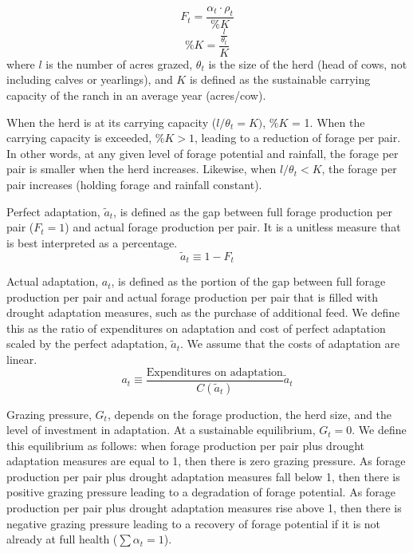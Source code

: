 \documentclass[11pt]{article}
\begin{document}
\begin{equation}
F_t = \frac{\alpha_t \cdot \rho_t}{\%K}
\end{equation}
\begin{equation}
\%K = \frac{\frac{l}{\theta_t}}{K}
\end{equation}
where $l$ is the number of acres grazed, $\theta_t$ is the size of the herd (head of cows, not including calves or yearlings), and $K$ is defined as the sustainable carrying capacity of the ranch in an average year (acres/cow).

When the herd is at its carrying capacity ($l/\theta_t = K)$, $\%K$ = 1. When the carrying capacity is exceeded, $\%K > 1$, leading to a reduction of forage per pair. In other words, at any given level of forage potential and rainfall, the forage per pair is smaller when the herd increases. Likewise, when $l / \theta_t < K$, the forage per pair increases (holding forage and rainfall constant). 

Perfect adaptation, $\tilde{a}_t$, is defined as the gap between full forage production per pair ($F_t = 1$) and actual forage production per pair. It is a unitless measure that is best interpreted as a percentage.
\begin{equation}
\tilde{a}_t \equiv 1 - F_t
\end{equation}

Actual adaptation, $a_t$, is defined as the portion of the gap between full forage production per pair and actual forage production per pair that is filled with drought adaptation measures, such as the purchase of additional feed. We define this as the ratio of expenditures on adaptation and cost of perfect adaptation scaled by the perfect adaptation, $\tilde{a}_t$. We assume that the costs of adaptation are linear. 
\begin{equation}
a_t \equiv \frac{\text{Expenditures on adaptation}}{C(\tilde{a}_t)} \tilde{a}_t
\end{equation}

Grazing pressure, $G_t$, depends on the forage production, the herd size, and the level of investment in adaptation. 
At a sustainable equilibrium, $G_t = 0$. 
We define this equilibrium as follows: when forage production per pair plus drought adaptation measures are equal to 1, then there is zero grazing pressure. As forage production per pair plus drought adaptation measures fall below 1, then there is positive grazing pressure leading to a degradation of forage potential. As forage production per pair plus drought adaptation measures rise above 1, then there is negative grazing pressure leading to a recovery of forage potential if it is not already at full health ($\sum \alpha_t = 1$).  
\end{document}
